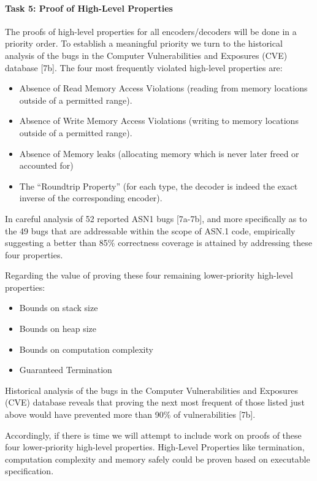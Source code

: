 \documentclass[acmsmall,nonacm]{acmart}
\begin{document}
\paragraph{Task 5: Proof of High-Level Properties} 
The proofs of high-level properties for all encoders/decoders will be done in a priority order. To establish a meaningful priority we turn to the historical analysis of the bugs in the Computer Vulnerabilities and Exposures (CVE) database [7b]. The four most frequently violated high-level properties are:
\begin{itemize}

\item Absence of Read Memory Access Violations (reading from memory locations outside of a permitted range).
\item Absence of Write Memory Access Violations (writing to memory locations outside of a permitted range).
\item Absence of Memory leaks (allocating memory which is never later freed or accounted for)
\item The ``Roundtrip Property'' (for each type, the decoder is indeed the exact inverse of the corresponding encoder).
\end{itemize}

In careful analysis of 52 reported ASN1 bugs [7a-7b], and more specifically as to the 49 bugs that are addressable within the scope of ASN.1 code, empirically suggesting a better than 85\% correctness coverage is attained by addressing  these four properties.

Regarding the value of proving these four remaining lower-priority high-level properties:
\begin{itemize}
\item Bounds on stack size
\item Bounds on heap size
\item Bounds on computation complexity
\item Guaranteed Termination
\end{itemize}
Historical analysis of the bugs in the Computer Vulnerabilities and Exposures (CVE) database reveals that proving the next most frequent of those listed just above would have prevented more than 90\% of vulnerabilities [7b]. 

Accordingly, if there is time we will attempt to include work on proofs of these four lower-priority high-level properties. High-Level Properties like termination, computation complexity and memory safely could be proven based on executable specification. 
\end{document}
